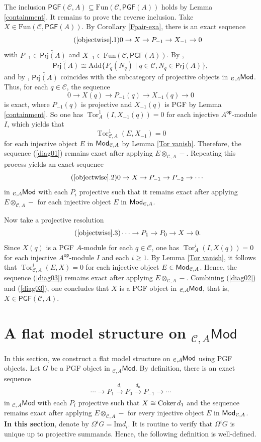 \documentclass{amsart}
\theoremstyle{bfupright head,slanted body}
\theoremstyle{bfupright head,upright body}
\theoremstyle{fixed bf head,slanted body}
\theoremstyle{fixed bf head,upright body}
\theoremstyle{numbered paragraph}
\newenvironment{prf*}[1][Proof]{%
	\begin{proof}[\bf #1]
		\setcounter{equation}{0}
		\renewcommand{\theequation}{\arabic{equation}}}
	{\end{proof}
}
\numberwithin{equation}{res}
\newcommand{\setof}[3][\mspace{1mu}]{\{#1#2 \mid #3#1\}}
\newcommand{\PGF}[1]{\mathsf{PGF}(#1)}
\newcommand{\Mod}[1]{{_{#1}\mathsf{Mod}}}
\newcommand{\Prj}[1]{\mathsf{Prj}(#1)}
\newcommand{\xra}[2][]{\xrightarrow[#1]{\:#2\:}}
\newcommand{\Tor}[4][]{\operatorname{Tor}_{#2}^{#1}(#3,#4)}
\newcommand{\Coker}[1]{\nobreak{\operatorname{Coker}#1}}
\newcommand{\Add}{\mathrm{Add}}
\newcommand{\Fun}{\mathrm{Fun}}
\newcommand{\C}{\mathcal{C}}
\newcommand{\is}{\cong}
\newcommand{\lMod}[1]{{}_{#1}\mspace{-1mu}{\sf{Mod}}}
\newcommand{\rMod}[1]{{\sf{Mod}}_{#1}}
\newcommand{\Aop}{A^{\mathsf{op}}}
\begin{document}
\begin{prf*}
The inclusion $\PGF{\C,A}\subseteq\Fun(\C,\PGF{A})$ holds by Lemma \ref{containment}. It remains to prove the reverse inclusion. Take $X\in\Fun(\C,\PGF{A})$. By Corollary \ref{Fpair-exa}, there is an exact sequence
\begin{equation*}\label{diag01}
\tag{\ref{objectwise}.1}
0 \to X \to P_{-1} \to X_{-1} \to 0
\end{equation*}
with $P_{-1}\in\widetilde{\Prj{A}}$ and $X_{-1}\in\Fun(\C,\PGF{A})$.
By \cite[Lemma 3.4]{HJ23},
\[\widetilde{\Prj{A}}\is\Add\setof{F_q(N_q)}{q\in\C, N_q\in\Prj{A}},\]
and by \cite[Proposition 3.12]{HJ21}, $\widetilde{\Prj{A}}$ coincides with the subcategory of projective objects in $\lMod{\C,A}$.
Thus, for each $q\in\C$, the sequence
\[0 \to X(q) \to P_{-1}(q) \to X_{-1}(q) \to 0\]
is exact, where $P_{-1}(q)$ is projective and $X_{-1}(q)$ is PGF by Lemma \ref{containment}. So one has $\Tor[1]{A}{I}{X_{-1}(q)}=0$ for each injective $\Aop$-module $I$, which yields that
\[\Tor[1]{\C,A}{E}{X_{-1}}=0\]
for each injective object $E$ in $\rMod{\C,A}$ by Lemma \ref{Tor vanish}.
Therefore, the sequence (\ref{diag01}) remains exact after applying $E\otimes_{\C,A}-$. Repeating this process yields an exact sequence
\begin{equation*}\label{diag02}
\tag{\ref{objectwise}.2}
0 \to X \to P_{-1} \to P_{-2} \to \cdots
\end{equation*}
in $\lMod{\C,A}$ with each $P_i$ projective such that it remains exact after applying $E\otimes_{\C,A}-$ for each injective object $E$ in $\rMod{\C,A}$.

Now take a projective resolution
\begin{equation*}\label{diag03}
\tag{\ref{objectwise}.3}
\cdots \to P_1 \to P_0 \to X \to 0.
\end{equation*}
Since $X(q)$ is a PGF $A$-module for each $q\in\C$, one has $\Tor[i]{A}{I}{X(q)}=0$ for each injective $\Aop$-module $I$ and each $i\geq 1$. By Lemma \ref{Tor vanish}, it follows that $\Tor[i]{\C,A}{E}{X}=0$ for each injective object $E\in\rMod{\C,A}$. Hence, the sequence (\ref{diag03}) remains exact after applying $E\otimes_{\C,A}-$. Combining (\ref{diag02}) and (\ref{diag03}), one concludes that $X$ is a PGF object in $\lMod{\C,A}$, that is, $X\in\PGF{\C,A}$.
\end{prf*}

\section{A flat model structure on $\Mod{\C,A}$}
\noindent
In this section, we construct a flat model structure on $\lMod{\C,A}$ using PGF objects. Let $G$ be a PGF object in $\Mod{\C,A}$.
By definition, there is an exact sequence
\[\cdots \to P_{1}\xra{d_{1}} P_{0}\xra{d_{0}} P_{-1}\to\cdots\]
in $\Mod{\C, A}$ with each $P_{i}$ projective such that $X\cong\Coker{d_1}$ and the sequence remains exact after applying $E\otimes_{\C,A}-$ for every injective object $E$ in $\rMod{\C,A}$.
\textbf{In this section}, denote by $\Omega^{i}G=\mathrm{Im} d_{i}$.
It is routine to verify that $\Omega^{i}G$ is unique up to projective summands.
Hence, the following definition is well-defined.
\end{document}
